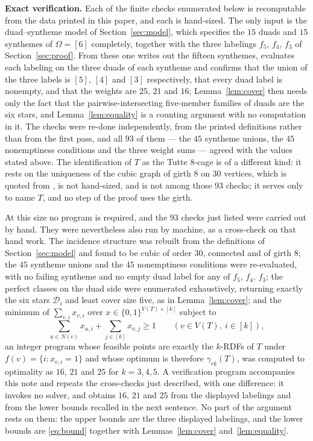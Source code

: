 \documentclass[11pt]{amsart}
\begin{document}
\medskip
\noindent\textbf{Exact verification.}
Each of the finite checks enumerated below is recomputable from the data
printed in this paper, and each is hand-sized. The only input is the
duad--syntheme model of Section~\ref{sec:model}, which specifies the $15$
duads and $15$ synthemes of $\Omega=[6]$ completely, together with the
three labelings
$f_5$, $f_4$, $f_3$ of Section~\ref{sec:proof}. From these one writes out
the fifteen synthemes, evaluates each labeling
on the three duads of each syntheme and confirms that the union of the
three labels is $[5]$, $[4]$ and $[3]$ respectively, that every duad
label is nonempty, and that the weights are $25$, $21$ and $16$;
Lemma~\ref{lem:cover} then needs only the fact that the
pairwise-intersecting five-member families of duads are the six stars,
and Lemma~\ref{lem:equality} is a counting argument with no computation
in it. The checks were re-done independently, from the printed
definitions rather than from the first pass, and all $93$ of them --- the
$45$ syntheme unions, the $45$ nonemptiness conditions and the three
weight sums --- agreed with the values stated above. The identification of
$T$ as the Tutte $8$-cage is of a different kind: it rests on the
uniqueness of the cubic graph of girth $8$ on $30$ vertices, which is
quoted from \cite{Coxeter1950}, is not hand-sized, and is not among those
$93$ checks; it serves only to name $T$, and no step of the proof uses the
girth.

At this size no program is required, and the $93$ checks just listed were
carried out by hand. They were nevertheless also run by machine, as a
cross-check on that hand work. The incidence structure was rebuilt from
the definitions of Section~\ref{sec:model} and found to be cubic of order
$30$, connected and of girth $8$; the $45$ syntheme unions and the $45$
nonemptiness conditions were re-evaluated, with no failing syntheme and no
empty duad label for any of $f_5$, $f_4$, $f_3$; the perfect classes on
the duad side were enumerated exhaustively, returning exactly the six
stars $\mathcal D_i$ and least cover size five, as in
Lemma~\ref{lem:cover}; and the minimum of $\sum_{v,i}x_{v,i}$ over
$x\in\{0,1\}^{V(T)\times[k]}$ subject to
\[
  \sum_{u\in N(v)}x_{u,i}+\sum_{j\in[k]}x_{v,j}\geq1
  \qquad (v\in V(T),\ i\in[k]),
\]
an integer program whose feasible points are exactly the $k$-RDFs of $T$
under $f(v)=\{i:x_{v,i}=1\}$ and whose optimum is therefore
$\gamma_{rk}(T)$, was computed to optimality as $16$, $21$ and $25$ for
$k=3,4,5$. A verification program accompanies this note and repeats the
cross-checks just described, with one difference: it invokes no solver, and
obtains $16$, $21$ and $25$ from the displayed labelings and from the lower
bounds recalled in the next sentence. No part of the argument rests on
them: the upper bounds are the three displayed labelings, and the lower
bounds are \eqref{eq:bound} together with Lemmas~\ref{lem:cover}
and~\ref{lem:equality}.
\end{document}
